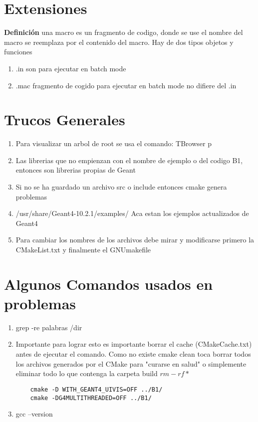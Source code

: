 \documentclass[10pt,a4paper,oneside]{book}
\begin{document}
\section*{Extensiones}
\textbf{Definición} una macro es un fragmento de codigo, donde se use
el nombre del macro se reemplaza por el contenido del macro. Hay de
dos tipos objetos y funciones
\begin{enumerate}
\item .in son para ejecutar en batch mode
\item .mac fragmento de cogido para ejecutar en batch mode no difiere
  del .in
\end{enumerate}

\section*{Trucos Generales}
\begin{enumerate}
\item Para visualizar un arbol de root se usa el comando: TBrowser p
\item Las librerias que no empienzan con el nombre de ejemplo o del
  codigo B1, entonces son librerias propias de Geant
\item Si no se ha guardado un archivo src o include entonces cmake
  genera problemas
\item /usr/share/Geant4-10.2.1/examples/ Aca estan los ejemplos
  actualizados de Geant4
\item Para cambiar los nombres de los archivos debe mirar y
  modificarse primero la CMakeList.txt y finalmente el GNUmakefile
\end{enumerate}

\section*{Algunos Comandos usados en problemas}
\begin{enumerate}
\item grep -re palabras /dir
\item Importante para lograr esto es importante borrar el cache
  (CMakeCache.txt) antes de ejecutar el comando. Como no existe cmake
  clean toca borrar todos los archivos generados por el CMake para
  "curarse en salud" o simplemente eliminar todo lo que contenga la
  carpeta build $rm -rf *$
  \begin{lstlisting}
    cmake -D WITH_GEANT4_UIVIS=OFF ../B1/
    cmake -DG4MULTITHREADED=OFF ../B1/
  \end{lstlisting}
\item gcc --version
\end{enumerate}
\end{document}
